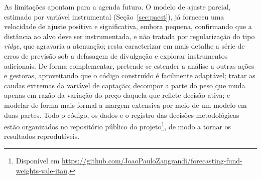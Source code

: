 \documentclass[12pt,a4paper]{article}
\begin{document}
As limitações apontam para a agenda futura. O modelo de ajuste parcial, estimado por variável
instrumental (Seção~\ref{sec:paest}), já forneceu uma velocidade de ajuste positiva e
significativa, embora pequena, confirmando que a distância ao alvo deve ser instrumentada, e não
tratada por regularização do tipo \emph{ridge}, que agravaria a atenuação; resta caracterizar em
mais detalhe a série de erros de previsão sob a defasagem de divulgação e explorar instrumentos
adicionais. De forma complementar,
pretende-se estender a análise a outras ações e gestoras, aproveitando que o código construído é
facilmente adaptável; tratar as caudas extremas da variável de captação; decompor a parte do peso
que muda apenas em razão da variação do preço daquela que reflete decisão ativa; e modelar de
forma mais formal a margem extensiva por meio de um modelo em duas partes. Todo o código, os dados
e o registro das decisões metodológicas estão organizados no repositório público do
projeto\footnote{Disponível em \url{https://github.com/JoaoPauloZangrandi/forecasting-fund-weights-vale-itau}.},
de modo a tornar os resultados reprodutíveis.

\newpage
{}
\end{document}
